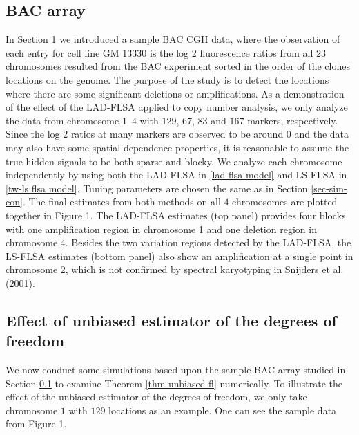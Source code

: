 \documentclass[12pt]{article}
\begin{document}
\subsection{BAC array}\label{sec-bac}

In Section 1 we introduced a sample BAC CGH data, where
the observation of each entry for cell line GM 13330 is the log $2$
fluorescence ratios from all $23$ chromosomes resulted from the BAC experiment sorted in the
order of the clones locations on the genome. The purpose of
the study is to detect the locations where there are some significant
deletions or amplifications. As a demonstration of  the effect of the LAD-FLSA
applied to copy number analysis, we only analyze the data
from chromosome 1--4 with $129$, $67$, $83$ and $167$ markers, respectively.
  Since the log $2$ ratios at many markers are observed to be around $0$
  and the data may also have some spatial
dependence properties, it is reasonable to
assume the true hidden signals to be both  sparse and blocky.
We analyze each chromosome independently by using both
the LAD-FLSA in \eqref{lad-flsa model} and LS-FLSA
in \eqref{tw-ls flsa model}.
 Tuning parameters are chosen the same as in Section \ref{sec-sim-con}.
The final estimates from both methods on all $4$ chromosomes are plotted together in Figure 1.
The LAD-FLSA estimates (top panel) provides four blocks with one amplification region
in chromosome 1 and one deletion region in chromosome 4.
Besides the two variation regions detected by the LAD-FLSA,
the LS-FLSA estimates (bottom panel) also show an amplification at
a single point in chromosome 2, which is not confirmed by spectral karyotyping
in  Snijders et al. (2001).


 \subsection{Effect of unbiased estimator of the degrees of freedom}\label{sec-sim-gdf}

We now conduct some simulations based upon the sample BAC array
studied in Section \ref{sec-bac} to examine
 Theorem \ref{thm-unbiased-fl} numerically.
To illustrate the effect of the unbiased estimator of the degrees of freedom, we only take
chromosome $1$ with  $129$ locations as an example. One can
see the sample data from Figure 1.
\end{document}
